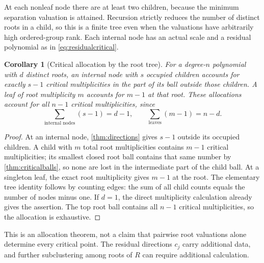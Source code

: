 \documentclass[11pt,letterpaper]{article}
\numberwithin{equation}{section}
\newtheorem{corollary}[theorem]{Corollary}
\theoremstyle{definition}
\theoremstyle{remark}\newtheorem{remark}[theorem]{Remark}
\begin{document}
At each nonleaf node there are at least two children, because the
minimum separation valuation is attained. Recursion strictly reduces
the number of distinct roots in a child, so this is a finite tree even
when the valuations have arbitrarily high ordered-group rank. Each
internal node has an actual scale and a residual polynomial as in
\eqref{eq:residualcritical}.

\begin{corollary}[Critical allocation by the root tree]\label{cor:tree}
For a degree-$n$ polynomial with $d$ distinct roots, an internal node
with $s$ occupied children accounts for exactly $s-1$ critical
multiplicities in the part of its ball outside those children. A leaf
of root multiplicity $m$ accounts for $m-1$ at that root. These
allocations account for all $n-1$ critical multiplicities, since
\[
 \sum_{\text{internal nodes}}(s-1)=d-1,\qquad
 \sum_{\text{leaves}}(m-1)=n-d.
\]
\end{corollary}
\begin{proof}
At an internal node, \cref{thm:directions} gives $s-1$ outside its
occupied children. A child with $m$ total root multiplicities contains
$m-1$ critical multiplicities; its smallest closed root ball contains
that same number by \cref{thm:criticalballs}, so none are lost in the
intermediate part of the child ball. At a singleton leaf, the exact
root multiplicity gives $m-1$ at the root. The elementary tree identity
follows by counting edges: the sum of all child counts equals the
number of nodes minus one. If $d=1$, the direct multiplicity calculation
already gives the assertion. The top root ball contains all $n-1$
critical multiplicities, so the allocation is exhaustive.
\end{proof}
This is an allocation theorem, not a claim that pairwise root valuations
alone determine every critical point. The residual directions $c_j$
carry additional data, and further subclustering among roots of $R$
can require additional calculation.
\end{document}
